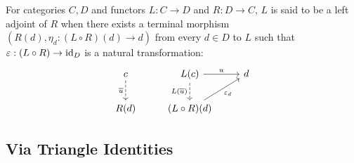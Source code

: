 \begin{definition}
  For categories $C,D$ and functors $L: C\to D$ and $R: D\to C$, $L$ is said to
  be a left adjoint of $R$ when there exists a terminal morphism $(R(d), \eta_d:
  (L\circ R)(d) \to d)$ from every $d\in D$ to $L$ such that $\varepsilon: (L\circ R)\to \mathrm{id}_D$ is a natural transformation:
  \parencite{awodey:category_theory}
  \[\begin{tikzcd}[ampersand replacement=\&]
    c \& {L(c)} \& d \\
    {R(d)} \& {(L\circ R)(d)}
    \arrow["{\overline{u}}"', dashed, from=1-1, to=2-1]
    \arrow["{L(\overline{u})}"', dashed, from=1-2, to=2-2]
    \arrow["{\varepsilon_d}"', from=2-2, to=1-3]
    \arrow["u", from=1-2, to=1-3]
  \end{tikzcd}\]
\end{definition}

\subsection{Via Triangle Identities}

